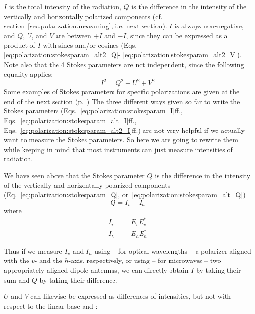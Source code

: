 $I$ is the total intensity of the radiation, 
$Q$ is the difference in the intensity of the vertically and
horizontally polarized components
(cf. section~\ref{sec:polarization:measuring}, i.e. next section).
$I$ is always non-negative, and $Q$, $U$, and $V$ are between $+I$ and $-I$,
since they can be expressed as a product of $I$ with sines and/or
cosines
(Eqs. \ref{eq:polarization:stokesparam_alt2_Q}-%
\ref{eq:polarization:stokesparam_alt2_V}). 
Note also that the 4 Stokes parameters are not independent, since the
following equality applies:
\begin{equation}
  \label{eq:polarization:Isquare}
  I^2 = Q^2 + U^2 + V^2
\end{equation}
Some examples of Stokes parameters for specific polarizations are given
at the end of the next section (p.~\pageref{stokes-examples})
\label{sec:polarization:measuring}
The three different ways given so far to write the Stokes parameters
(Eqs.~\ref{eq:polarization:stokesparam_I}ff.,
Eqs.~\ref{eq:polarization:stokesparam_alt_I}ff.,
Eqs.~\ref{eq:polarization:stokesparam_alt2_I}ff.)  are not very
helpful if we actually want to measure the Stokes parameters. So here
we are going to rewrite them while keeping in mind that most
instruments can just measure intensities of radiation.

We have seen above that the Stokes parameter $Q$ is the difference in
the intensity of the vertically and horizontally polarized components 
(Eq.~\ref{eq:polarization:stokesparam_Q},
or~\ref{eq:polarization:stokesparam_alt_Q})
\begin{equation}
  \label{eq:polarization:Q_Idiff}
  Q = I_v - I_h
\end{equation}
where
\begin{eqnarray}
  \label{eq:polarization:Iv}
  I_v &=& E_v E_v^\ast\\
  \label{eq:polarization:Ih}
  I_h &=& E_h E_h^\ast
\end{eqnarray}
  
Thus if we measure $I_v$ and $I_h$ using -- for optical wavelengths --
a polarizer aligned with the $v$- and the $h$-axis, respectively, or
using -- for microwaves -- two appropriately aligned dipole antennas, we
can directly obtain $I$ by taking their sum and $Q$ by taking their
difference.

$U$ and $V$ can likewise be expressed as differences of intensities, but not
with respect to the linear base \eVrt and \eHor:


